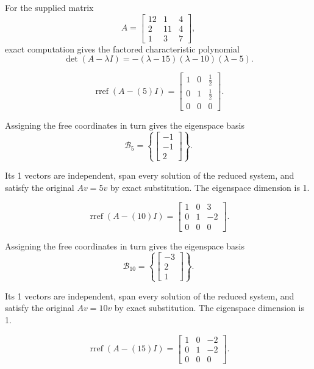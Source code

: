 For the supplied matrix
\[ A=\begin{bmatrix}12 & 1 & 4\\2 & 11 & 4\\1 & 3 & 7\end{bmatrix},\]
exact computation gives the factored characteristic polynomial
\[ \det(A-\lambda I)=- \left(\lambda - 15\right) \left(\lambda - 10\right) \left(\lambda - 5\right).\]

\[ \operatorname{rref}(A-(5)I)=\begin{bmatrix}1 & 0 & \frac{1}{2}\\0 & 1 & \frac{1}{2}\\0 & 0 & 0\end{bmatrix}.\]

Assigning the free coordinates in turn gives the eigenspace basis
\[ \mathcal B_{5}=\left\{\begin{bmatrix}-1\\-1\\2\end{bmatrix}\right\}.\]

Its 1 vectors are independent, span every solution of the reduced system, and satisfy the original $Av=5v$ by exact substitution. The eigenspace dimension is 1.

\[ \operatorname{rref}(A-(10)I)=\begin{bmatrix}1 & 0 & 3\\0 & 1 & -2\\0 & 0 & 0\end{bmatrix}.\]

Assigning the free coordinates in turn gives the eigenspace basis
\[ \mathcal B_{10}=\left\{\begin{bmatrix}-3\\2\\1\end{bmatrix}\right\}.\]

Its 1 vectors are independent, span every solution of the reduced system, and satisfy the original $Av=10v$ by exact substitution. The eigenspace dimension is 1.

\[ \operatorname{rref}(A-(15)I)=\begin{bmatrix}1 & 0 & -2\\0 & 1 & -2\\0 & 0 & 0\end{bmatrix}.\]

